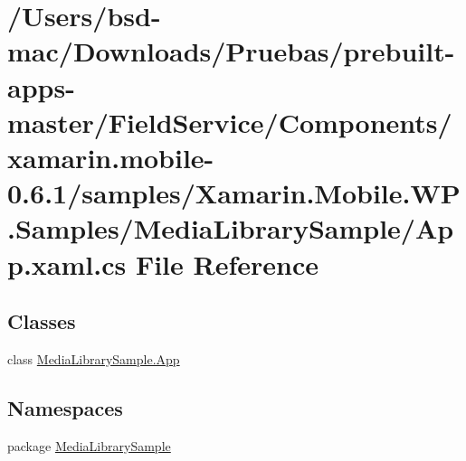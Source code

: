 \hypertarget{_components_2xamarin_8mobile-0_86_81_2samples_2_xamarin_8_mobile_8_w_p_8_samples_2_media_library_sample_2_app_8xaml_8cs}{\section{/\+Users/bsd-\/mac/\+Downloads/\+Pruebas/prebuilt-\/apps-\/master/\+Field\+Service/\+Components/xamarin.mobile-\/0.6.1/samples/\+Xamarin.Mobile.\+W\+P.\+Samples/\+Media\+Library\+Sample/\+App.xaml.\+cs File Reference}
\label{_components_2xamarin_8mobile-0_86_81_2samples_2_xamarin_8_mobile_8_w_p_8_samples_2_media_library_sample_2_app_8xaml_8cs}
}
\subsection*{Classes}
\begin{DoxyCompactItemize}
\item 
class \hyperlink{class_media_library_sample_1_1_app}{Media\+Library\+Sample.\+App}
\end{DoxyCompactItemize}
\subsection*{Namespaces}
\begin{DoxyCompactItemize}
\item 
package \hyperlink{namespace_media_library_sample}{Media\+Library\+Sample}
\end{DoxyCompactItemize}
